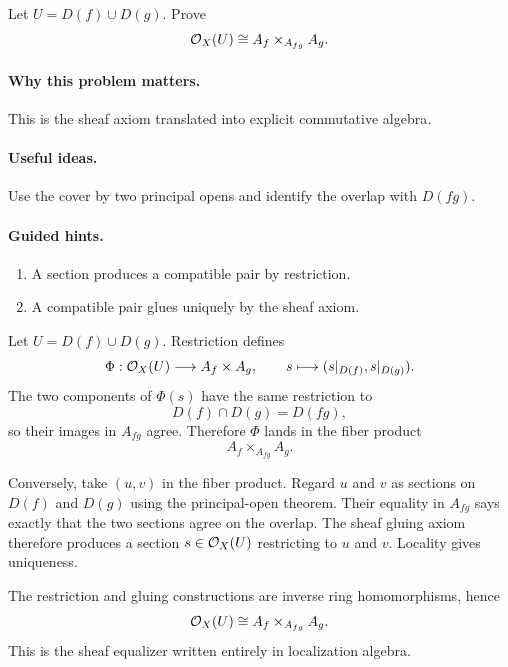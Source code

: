 \begin{problem}\label{prob:vi17-p10}
Let $U=D(f)\cup D(g)$.  Prove
\[\mathcal O_X(U)\cong A_f\times_{A_{fg}}A_g.\]
\end{problem}

\ifdefined\FullProblemDossiers
\paragraph{Why this problem matters.}
This is the sheaf axiom translated into explicit commutative algebra.

\paragraph{Useful ideas.}
Use the cover by two principal opens and identify the overlap with $D(fg)$.

\paragraph{Guided hints.}
\begin{enumerate}
\item A section produces a compatible pair by restriction.
\item A compatible pair glues uniquely by the sheaf axiom.
\end{enumerate}

\begin{solution}
Let $U=D(f)\cup D(g)$.  Restriction defines
\[
\Phi:\mathcal O_X(U)\longrightarrow A_f\times A_g,
\qquad
s\longmapsto (s|_{D(f)},s|_{D(g)}).
\]
The two components of $\Phi(s)$ have the same restriction to
\[
D(f)\cap D(g)=D(fg),
\]
so their images in $A_{fg}$ agree.  Therefore $\Phi$ lands in the fiber product
\[
A_f\times_{A_{fg}}A_g.
\]

Conversely, take $(u,v)$ in the fiber product.  Regard $u$ and $v$ as sections on $D(f)$ and $D(g)$ using the principal-open theorem.  Their equality in $A_{fg}$ says exactly that the two sections agree on the overlap.  The sheaf gluing axiom therefore produces a section $s\in\mathcal O_X(U)$ restricting to $u$ and $v$.  Locality gives uniqueness.

The restriction and gluing constructions are inverse ring homomorphisms, hence
\[
\mathcal O_X(U)\cong A_f\times_{A_{fg}}A_g.
\]
This is the sheaf equalizer written entirely in localization algebra.
\end{solution}



